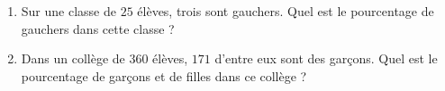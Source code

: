 
\begin{exercice}\label{exo2smath-0121}

    \begin{enumerate}
\item
    Sur une classe de \( 25\) élèves, trois sont gauchers. Quel est le pourcentage de gauchers dans cette classe ?
        \item
Dans un collège de $360$ élèves, $171$ d'entre eux sont des garçons. Quel est le pourcentage de garçons et de filles dans ce collège ?
    \end{enumerate}

\end{exercice}
